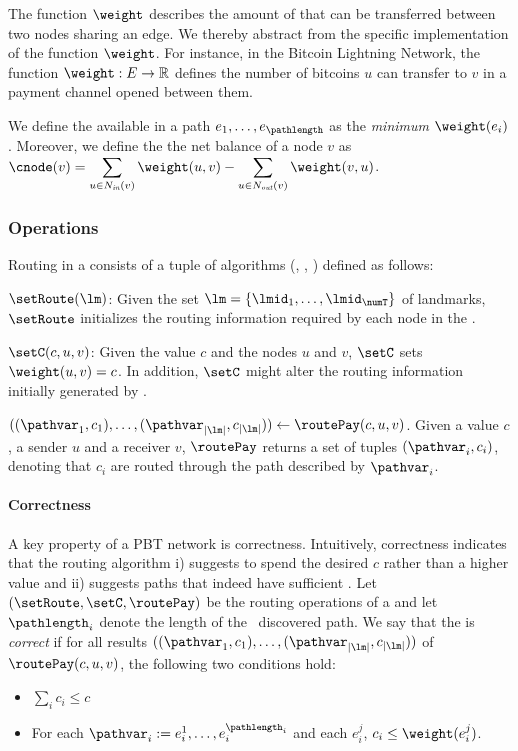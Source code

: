  
The function $\weight$ describes the amount of \money that can be transferred between two nodes 
sharing an edge. We thereby abstract from the specific implementation of the function $\weight$.  
For instance, in the Bitcoin Lightning Network, the function $\weight: E \rightarrow \mathbb{R}$ defines the number of bitcoins
$u$ can  transfer to $v$ in a payment channel opened between them. 

We define the \money available in a path $e_1, \ldots, e_\pathlength$ as the \emph{minimum} $\weight(e_i)$. 
Moreover, we define the the net balance of a node $v$ as 
$\displaystyle{\cnode(v)=\sum_{u \in N_{\textit{in}}(v)} \weight(u,v) - \sum_{u \in N_{\textit{out}}(v)} \weight(v,u)}$.

\subsubsection{Operations}
\label{sec:paysys-operations}
Routing  in a \paysys consists of a tuple of algorithms (\setRoute, \setC, \routePay) defined as follows: 
\begin{asparadesc}
\item $\setRoute(\lm)$: Given the set 
$\lm=\{\lmid_1, \ldots, \lmid_{\numT}\}$ of landmarks, $\setRoute$ initializes the routing information required by 
each node in the \paysys. 

\item $\setC(c,u,v)$: Given the value $c$ and the nodes $u$ and $v$, $\setC$ sets $\weight(u,v) = c$. In addition, $\setC$ might alter the routing information initially generated by \setRoute. 

\item $((\pathvar_1, c_1), \ldots, (\pathvar_{|\lm|}, c_{|\lm|})) \gets \routePay(c,u,v)$. Given a value $c$, a sender $u$ and a receiver $v$, $\routePay$ returns a set of 
tuples $(\pathvar_i, c_i)$, denoting that $c_i$ \money are routed through the path 
described by $\pathvar_i$. 
\end{asparadesc}

\paragraph{Correctness}
A key property of a PBT network is correctness. Intuitively, correctness indicates that the routing algorithm i) suggests to spend  the desired \money $c$ rather than a higher value and ii) suggests paths that indeed have sufficient \money.  
Let $(\setRoute, \setC, \routePay)$ be the routing operations 
of a \paysys and let $\pathlength_i$ denote the length of the \ith\ discovered path. 
We say that the \paysys is \emph{correct} if for all results 
 $((\pathvar_1, c_1), \ldots, (\pathvar_{|\lm|}, c_{|\lm|}))$ of  
$\routePay(c,u,v)$, the following two conditions hold: 
\begin{itemize}
\item $\sum_{i} c_i \leq c$
\item For each $\pathvar_i := e_{i}^1, \ldots, e^{\pathlength_i}_i$ and each $e^{j}_i$, 
$c_i \leq \weight(e^{j}_i)$. 
\end{itemize}

